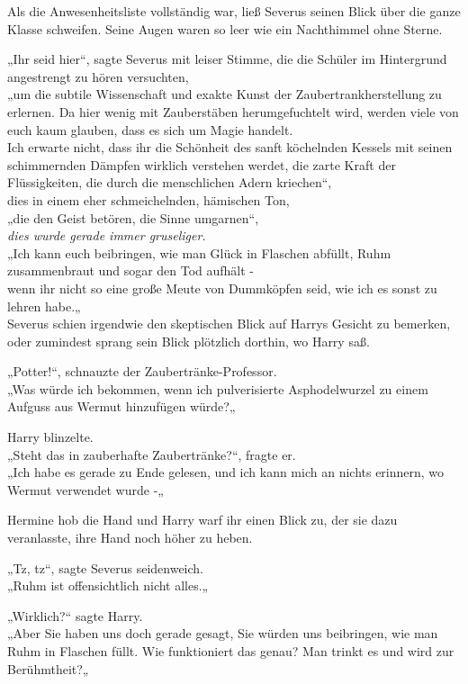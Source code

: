 {Als die Anwesenheitsliste vollständig war, ließ Severus seinen Blick über die ganze Klasse schweifen. Seine Augen waren so leer wie ein Nachthimmel ohne Sterne.

„Ihr seid hier“, sagte Severus mit leiser Stimme, die die Schüler im Hintergrund angestrengt zu hören versuchten,\\ „um die subtile Wissenschaft und exakte Kunst der Zaubertrankherstellung zu erlernen. Da hier wenig mit Zauberstäben herumgefuchtelt wird, werden viele von euch kaum glauben, dass es sich um Magie handelt.\\ Ich erwarte nicht, dass ihr die Schönheit des sanft köchelnden Kessels mit seinen schimmernden Dämpfen wirklich verstehen werdet, die zarte Kraft der Flüssigkeiten, die durch die menschlichen Adern kriechen“,\\ dies in einem eher schmeichelnden, hämischen Ton,\\ „die den Geist betören, die Sinne umgarnen“,\\ \emph{dies wurde gerade immer gruseliger.}\\ „Ich kann euch beibringen, wie man Glück in Flaschen abfüllt, Ruhm zusammenbraut und sogar den Tod aufhält -\\ wenn ihr nicht so eine große Meute von Dummköpfen seid, wie ich es sonst zu lehren habe.„\\ Severus schien irgendwie den skeptischen Blick auf Harrys Gesicht zu bemerken, oder zumindest sprang sein Blick plötzlich dorthin, wo Harry saß.

„Potter!“, schnauzte der Zaubertränke-Professor.\\ „Was würde ich bekommen, wenn ich pulverisierte Asphodelwurzel zu einem Aufguss aus Wermut hinzufügen würde?„

Harry blinzelte.\\ „Steht das in zauberhafte Zaubertränke?“, fragte er.\\ „Ich habe es gerade zu Ende gelesen, und ich kann mich an nichts erinnern, wo Wermut verwendet wurde -„

Hermine hob die Hand und Harry warf ihr einen Blick zu, der sie dazu veranlasste, ihre Hand noch höher zu heben.

„Tz, tz“, sagte Severus seidenweich.\\ „Ruhm ist offensichtlich nicht alles.„

„Wirklich?“ sagte Harry.\\ „Aber Sie haben uns doch gerade gesagt, Sie würden uns beibringen, wie man Ruhm in Flaschen füllt. Wie funktioniert das genau? Man trinkt es und wird zur Berühmtheit?„

}
